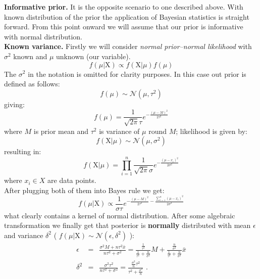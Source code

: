 \documentclass[12pt, a4paper, pdflatex, leqno]{report}
\begin{document}

\textbf{\textrm{Informative prior. }}It is the opposite scenario to one described above. With known distribution of the prior the application of Bayesian statistics is straight forward. From this point onward we will assume that our prior is informative with normal distribution.\\

\textbf{\textrm{Known variance. }}Firstly we will consider \emph{normal prior--normal likelihood} with $\sigma^2$ known and $\mu$ unknown (our variable).
$$
f \left( \mu | \mathrm{X} \right) \propto f \left( \mathrm{X} | \mu \right) f \left( \mu \right)
$$
The $\sigma^2$ in the notation is omitted for clarity purposes. In this case out prior is defined as follows:
$$
f \left( \mu \right)    \sim   \mathcal{N}\left( \mu, \tau^2 \right)
$$
giving:
$$
f \left( \mu \right)    =     \frac{1}{\sqrt{2\pi} \tau} e^{- \frac{{\left( \mu - M \right)}^2}{2 \tau^2} }
$$
where $M$ is prior mean and $\tau^2$ is variance of $\mu$ round $M$; likelihood is given by:
$$
f \left( \mathrm{X} | \mu \right)     \sim    \mathcal{N}\left( \mu, \sigma^2 \right)
$$
resulting in:
$$
f \left( \mathrm{X} | \mu \right)    =     \prod_{i=1}^{n} \frac{1}{\sqrt{2\pi} \sigma} e^{- \frac{{\left( \mu - x_i \right)}^2}{2 \sigma^2} }
$$
where $x_i \in X$ are data points.\\
After plugging both of them into Bayes rule we get:
$$
f \left( \mu | \mathrm{X} \right)     \propto     \frac{1}{\sigma \tau} e^{ -\frac{ {\left( \mu - M \right)}^2 }{2 \tau^2} -\frac{ \sum_{i=1}^{n} {\left( \mu - x_i \right)}^2 }{2 \sigma^2} }
$$
what clearly contains a kernel of normal distribution. After some algebraic transformation we finally get that posterior is \textbf{normally} distributed with mean $\epsilon$ and variance $\delta^2$ ( $f \left( \mu | \mathrm{X} \right) \sim \mathcal{N} \left( \epsilon, \delta^2 \right) $ ):
\begin{eqnarray*}
\epsilon &=& \frac{\sigma^2 M + n \tau^2 \bar{x}}{n \tau^2 + \sigma^2} = \frac{ \frac{1}{\tau^2} }{ \frac{1}{\tau^2} + \frac{n}{\sigma^2} }M + \frac{ \frac{n}{\sigma^2} }{ \frac{1}{\tau^2} + \frac{n}{\sigma^2} } \bar{x} \\
\delta^2 &=& \frac{\sigma^2 \tau^2}{n \tau^2 + \sigma^2} = \frac{ \frac{\sigma^2}{n} \tau^2 }{ \tau^2 + \frac{\sigma^2}{n} } \text{ .}
\end{eqnarray*}
\\
\end{document}

